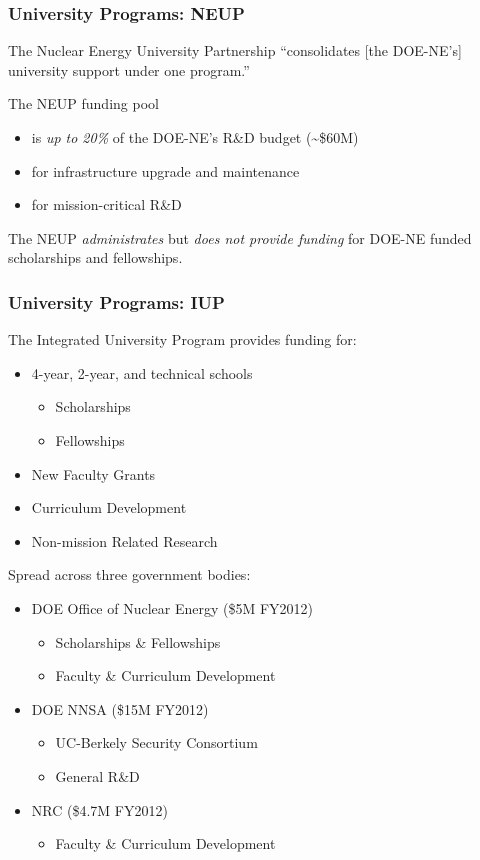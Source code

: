 \begin{frame}[ctb!]
  \frametitle{University Programs: NEUP}
  The Nuclear Energy University Partnership ``consolidates [the DOE-NE's] 
  university support under one program.''
  \vspace{0.4cm}
  \pause
  
  The NEUP funding pool
  \begin{itemize}
    \item is \emph{up to 20\%} of the DOE-NE's R\&D budget (\textasciitilde\$60M)
    \item for infrastructure upgrade and maintenance
    \item for mission-critical R\&D
  \end{itemize}
  \vspace{0.3cm}
  \pause
  
  The NEUP \emph{administrates} but \emph{does not provide funding} for
  DOE-NE funded scholarships and fellowships.
\end{frame}

\begin{frame}[ctb!]
  \frametitle{University Programs: IUP}
  The Integrated University Program provides funding for:
  \begin{itemize}
    \item 4-year, 2-year, and technical schools
      \begin{itemize}
        \item Scholarships
        \item Fellowships
      \end{itemize}
    \item New Faculty Grants
    \item Curriculum Development
    \item Non-mission Related Research
  \end{itemize}
  \pause
  Spread across three government bodies:
  \begin{itemize}
    \item DOE Office of Nuclear Energy (\$5M FY2012)
      \begin{itemize}
        \item Scholarships \& Fellowships
        \item Faculty \& Curriculum Development
      \end{itemize}
    \item DOE NNSA (\$15M FY2012)
      \begin{itemize}
        \item UC-Berkely Security Consortium
        \item General R\&D
      \end{itemize}
    \item NRC (\$4.7M FY2012)
      \begin{itemize}
        \item Faculty \& Curriculum Development
       \end{itemize}
  \end{itemize}
\end{frame}

